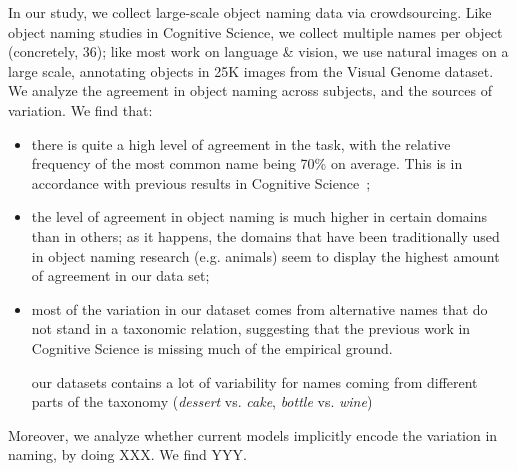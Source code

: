 In our study, we collect large-scale object naming data via crowdsourcing.
Like object naming studies in Cognitive Science, we collect multiple names per object (concretely, 36); like most work on language \& vision, we use natural images  on a large scale, annotating objects in 25K images from the Visual Genome dataset.
We analyze the agreement in object naming across subjects, and the sources of variation. We find that: 

\begin{itemize}
\item there is quite a high level of agreement in the task, with the relative frequency of the most common name being 70\% on average. This is in accordance with previous results in Cognitive Science~\cite{add-ref};
\item the level of agreement in object naming is much higher in certain domains than in others; as it happens, the domains that have been traditionally used in object naming research (e.g. animals) seem to display the highest amount of agreement in our data set;
\item most of the variation in our dataset comes from alternative names that do not stand in a taxonomic relation, suggesting that the previous work in Cognitive Science is missing much of the empirical ground.

our datasets contains a lot of variability for names coming from different parts of the taxonomy (\emph{dessert} vs. \emph{cake}, \emph{bottle} vs. \emph{wine})
\end{itemize}

Moreover, we analyze whether current models implicitly encode the variation in naming, by doing XXX. We find YYY.



